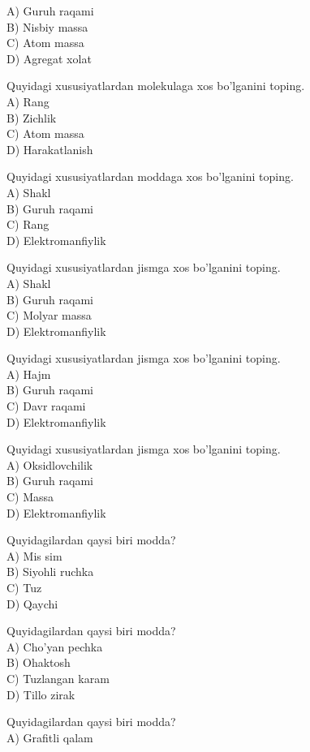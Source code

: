A) Guruh raqami\\
B) Nisbiy massa\\
C) Atom massa\\
D) Agregat xolat
  \item Quyidagi xususiyatlardan molekulaga xos bo'lganini toping.\\
A) Rang\\
B) Zichlik\\
C) Atom massa\\
D) Harakatlanish
  \item Quyidagi xususiyatlardan moddaga xos bo'lganini toping.\\
A) Shakl\\
B) Guruh raqami\\
C) Rang\\
D) Elektromanfiylik
  \item Quyidagi xususiyatlardan jismga xos bo'lganini toping.\\
A) Shakl\\
B) Guruh raqami\\
C) Molyar massa\\
D) Elektromanfiylik
  \item Quyidagi xususiyatlardan jismga xos bo'lganini toping.\\
A) Hajm\\
B) Guruh raqami\\
C) Davr raqami\\
D) Elektromanfiylik
  \item Quyidagi xususiyatlardan jismga xos bo'lganini toping.\\
A) Oksidlovchilik\\
B) Guruh raqami\\
C) Massa\\
D) Elektromanfiylik
  \item Quyidagilardan qaysi biri modda?\\
A) Mis sim\\
B) Siyohli ruchka\\
C) Tuz\\
D) Qaychi
  \item Quyidagilardan qaysi biri modda?\\
A) Cho'yan pechka\\
B) Ohaktosh\\
C) Tuzlangan karam\\
D) Tillo zirak
  \item Quyidagilardan qaysi biri modda?\\
A) Grafitli qalam\\
